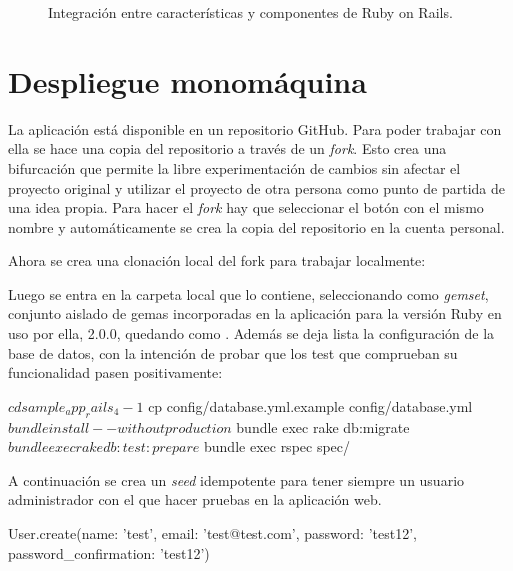 \begin{figure}[H]
\caption{Integración entre características y componentes de Ruby on Rails.\label{fig:figure_placement_example}}
\end{figure}

\section{Despliegue monomáquina}

La aplicación  está disponible en un repositorio GitHub. Para poder trabajar con ella se hace una copia del repositorio a través de un \textit{fork}. Esto crea una bifurcación que permite la libre experimentación de cambios sin afectar el proyecto original y utilizar el proyecto de otra persona como punto de partida de una idea propia. Para hacer el \textit{fork} hay que seleccionar el botón con el mismo nombre y automáticamente se crea la copia del repositorio en la cuenta personal.

Ahora se crea una clonación local del fork para trabajar localmente:


Luego se entra en la carpeta local que lo contiene, seleccionando como \textit{gemset}, conjunto aislado de gemas incorporadas en la aplicación para la versión Ruby en uso por ella, 2.0.0, quedando como . Además se deja lista la configuración de la base de datos, con la intención de probar que los test que comprueban su funcionalidad pasen positivamente: 

\begin{code}
$ cd sample_app_rails_4-1
$ cp config/database.yml.example config/database.yml
$ bundle install --without production
$ bundle exec rake db:migrate
$ bundle exec rake db:test:prepare
$ bundle exec rspec spec/
\end{code}

A continuación se crea un \textit{seed} idempotente para tener siempre un usuario administrador con el que hacer pruebas en la aplicación web.

\begin{codelisting}
\label{code:seed1}
\begin{code}
User.create(name: 'test', email: 'test@test.com',
password: 'test12', password_confirmation: 'test12')
\end{code}
\end{codelisting}

